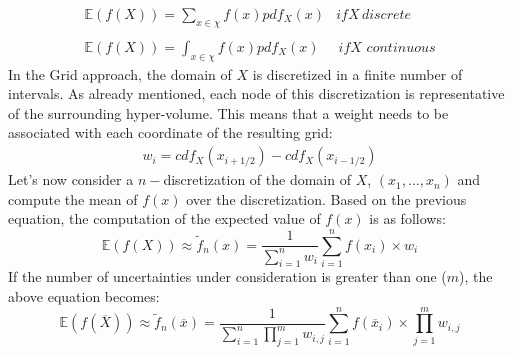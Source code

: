 \begin{equation}
\begin{matrix}
\mathbb{E}(f(X)) =\sum_{x \in \chi} f(x)pdf_{X}(x) & if X \, discrete \\ 
\\ 
\mathbb{E}(f(X)) =\int_{x \in \chi} f(x)pdf_{X}(x) & \, if X \, \, continuous
\end{matrix}
\end{equation}
In the Grid approach, the domain of $X$ is discretized in a finite number of intervals. As already mentioned,
each node of this discretization is representative of the surrounding hyper-volume. This means that a weight 
needs to be associated with each coordinate of the resulting grid:
\begin{equation}
\begin{matrix}
  w_{i}= cdf_{X}(x_{i+1/2}) - cdf_{X}(x_{i-1/2})
\end{matrix}  
\end{equation}
Let's now consider 
a $n-$discretization of the domain of  $X$, $(x_{1},...,x_{n})$ and compute the mean of $f(x)$ over the discretization. Based on the previous equation, the computation of the expected value of $f(x)$ is as follows:
\begin{equation}
 \mathbb{E}(f(X)) \approx   \widetilde{f}_{n}(x) = \frac{1}{\sum_{i=1}^{n}w_{i}} \sum_{i=1}^{n} f(x_{i}) \times w_{i}
\end{equation}
If the number of uncertainties under consideration is greater than one ($m$), the above equation
becomes:
\begin{equation}
\mathbb{E}(f(\overline{X})) \approx   \widetilde{f}_{n}(\overline{x}) = \frac{1}{\sum_{i=1}^{n}\prod_{j=1}^{m}w_{i,j}} \sum_{i=1}^{n} f(\overline{x}_{i}) \times \prod_{j=1}^{m}w_{i,j}
\end{equation}
